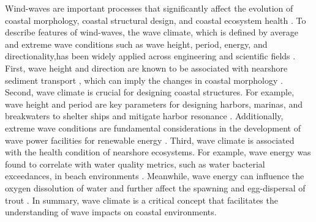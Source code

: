 Wind-waves are important processes that significantly affect the evolution of
coastal morphology, coastal structural design, and coastal ecosystem health
\citep{casas2024wind}. To describe features of wind-waves, the wave climate,
which is defined by average and extreme wave conditions such as wave height,
period, energy, and directionality,has been widely applied across engineering
and scientific fields 
\citep{wiegel_oceanographical_1964,wiegel_oceanographical_2013}. First, wave
height and direction are known to be associated with nearshore sediment
transport \citep{pethick_introduction_1984,davila_promoting_2014}, which can
imply the changes in coastal morphology
\citep{lamoe_wave_1989,benumof_relationship_2000,brown_factors_2005}. Second,
wave climate is crucial for designing coastal structures. For example, wave
height and period are key parameters for designing harbors, marinas, and
breakwaters to shelter ships and mitigate harbor resonance
\citep{belvoir_problems_1981,usace_hydraulic_1984,rabinovich_seiches_2009}.
Additionally, extreme wave conditions are fundamental considerations in the
development of wave power facilities for renewable energy 
\citep{guillou_wave_2020,neary_characterization_2020}. Third, wave climate is
associated with the health condition of nearshore ecosystems. For example, wave
energy was found to correlate with water quality metrics, such as water
bacterial exceedances, in beach environments \citep{feng_wave_2016}. Meanwhile,
wave energy can influence the oxygen dissolution of water and further affect the
spawning and egg-dispersal of trout
\citep{sly_interstitial_1988,fitzsimons_relationship_2014}. In summary, wave
climate is a critical concept that facilitates the understanding of wave impacts
on coastal environments.

